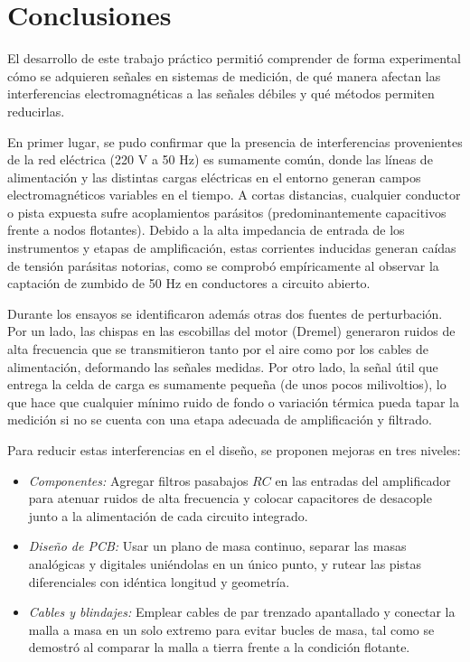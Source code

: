 \chapter{Conclusiones}

El desarrollo de este trabajo práctico permitió comprender de forma experimental cómo se adquieren señales en sistemas de medición, de qué manera afectan las interferencias electromagnéticas a las señales débiles y qué métodos permiten reducirlas.

En primer lugar, se pudo confirmar que la presencia de interferencias
provenientes de la red eléctrica (220 V a 50 Hz) es sumamente común, donde las
líneas de alimentación y las distintas cargas eléctricas en el entorno generan
campos electromagnéticos variables en el tiempo. A cortas distancias, cualquier
conductor o pista expuesta sufre acoplamientos parásitos (predominantemente
capacitivos frente a nodos flotantes). Debido a la alta impedancia de entrada de
los instrumentos y etapas de amplificación, estas corrientes inducidas generan
caídas de tensión parásitas notorias, como se comprobó empíricamente al observar
la captación de zumbido de 50 Hz en conductores a circuito abierto.

Durante los ensayos se identificaron además otras dos fuentes de perturbación.
Por un lado, las chispas en las escobillas del motor (Dremel) generaron ruidos
de alta frecuencia que se transmitieron tanto por el aire como por los cables de
alimentación, deformando las señales medidas. Por otro lado, la señal útil que
entrega la celda de carga es sumamente pequeña (de unos pocos milivoltios), lo
que hace que cualquier mínimo ruido de fondo o variación térmica pueda tapar la
medición si no se cuenta con una etapa adecuada de amplificación y filtrado.

Para reducir estas interferencias en el diseño, se proponen mejoras en tres niveles:
\begin{itemize}\setlength\itemsep{1pt}\setlength\parskip{0pt}
    \item \emph{Componentes:} Agregar filtros pasabajos $RC$ en las entradas del amplificador para atenuar ruidos de alta frecuencia y colocar capacitores de desacople junto a la alimentación de cada circuito integrado.
    \item \emph{Diseño de PCB:} Usar un plano de masa continuo, separar las masas analógicas y digitales uniéndolas en un único punto, y rutear las pistas diferenciales con idéntica longitud y geometría.
    \item \emph{Cables y blindajes:} Emplear cables de par trenzado apantallado y conectar la malla a masa en un solo extremo para evitar bucles de masa, tal como se demostró al comparar la malla a tierra frente a la condición flotante.
\end{itemize}

